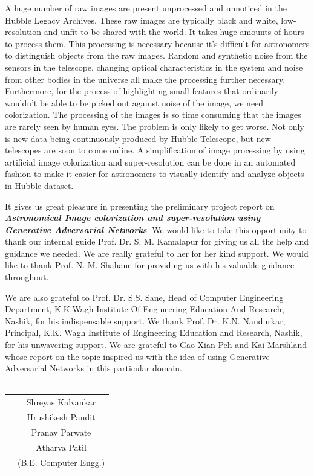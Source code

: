 \documentclass[oneside,a4paper,12pt]{report}
\begin{document}
\hspace*{0.25 in}A huge number of raw images are present unprocessed and unnoticed in the Hubble Legacy Archives. These raw images are typically black and white, low-resolution and unfit to be shared with the world. It takes huge amounts of hours to process them. This processing is necessary because it's difficult for astronomers to distinguish objects from the raw images. Random and synthetic noise from the sensors in the telescope, changing optical characteristics in the system and noise from other bodies in the universe all make the processing further necessary. Furthermore, for the process of highlighting small features that ordinarily wouldn't be able to be picked out against noise of the image, we need colorization. The processing of the images is so time consuming that the images are rarely seen by human eyes. The problem is only likely to get worse. Not only is new data being continuously produced by Hubble Telescope, but new telescopes are soon to come online. A simplification of image processing by using artificial image colorization and super-resolution can be done in an automated fashion to make it easier for astronomers to visually identify and analyze objects in Hubble dataset.

{   \setlength{\parindent}{11mm} }
{ \setlength{\parindent}{0mm} }
\hspace{0.25 in}It gives us great pleasure in presenting the preliminary project report on \textbf{\textit{Astronomical Image colorization and super-resolution using Generative Adversarial Networks}}.
We would like to take this opportunity to thank our internal guide Prof. Dr. S. M. Kamalapur for giving us all the help and guidance we needed. We are really grateful to her for her kind support. We would like to thank Prof. N. M. Shahane for providing us with his valuable guidance throughout.

\hspace{0.25 in}We are also grateful to Prof. Dr. S.S. Sane, Head of Computer Engineering Department,
K.K.Wagh Institute Of Engineering Education And Research, Nashik,
for his indispensable support. We thank Prof. Dr. K.N. Nandurkar, Principal, K.K. Wagh Institute of Engineering Education and Research, Nashik, for his unwavering support.
We are grateful to Gao Xian Peh and Kai Marshland whose report on the topic inspired us with the idea of using Generative Adversarial Networks in this particular domain.\\
\vspace*{3\baselineskip} \\
\begin{tabular}{p{8.2cm}c}
&Shreyas Kalvankar\\
&Hrushikesh Pandit\\
&Pranav Parwate\\
&Atharva Patil\\
&(B.E. Computer Engg.)
\end{tabular}
\end{document}
